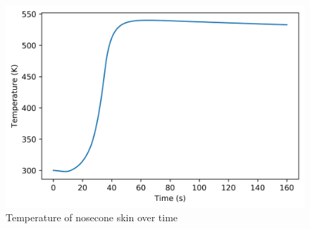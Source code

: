 \documentclass[twocolumn]{article}
\begin{document}
            \begin{figure}[h]
                \includegraphics[width=\linewidth]{tempprofile.png}
                \caption{Temperature of nosecone skin over time}
                \label{fig:temptime}
            \end{figure}
\end{document}
